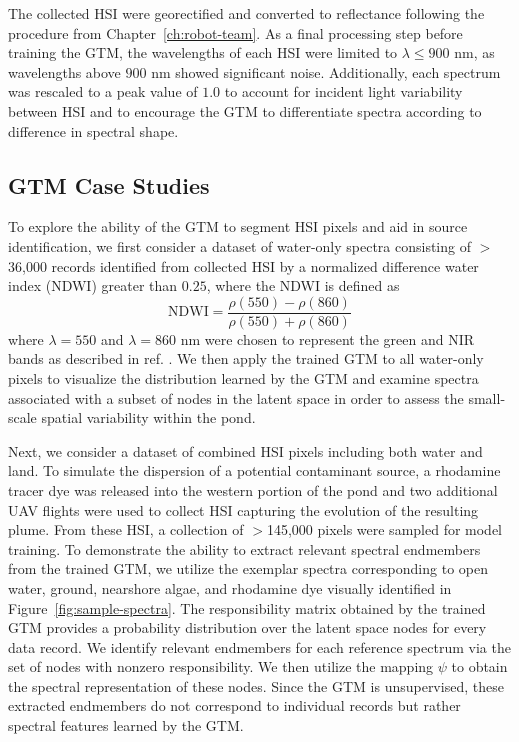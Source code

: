 The collected HSI were georectified and converted to reflectance following the
procedure from Chapter~\ref{ch:robot-team}. As a final processing step before
training the GTM, the wavelengths of each HSI were limited to $\lambda \leq 900$
nm, as wavelengths above $900$ nm showed significant noise. Additionally, each
spectrum was rescaled to a peak value of $1.0$ to account for incident light
variability between HSI and to encourage the GTM to differentiate spectra
according to difference in spectral shape.

\subsection{GTM Case Studies}\label{sec:case-studies}

To explore the ability of the GTM to segment HSI pixels and aid in source
identification, we first consider a dataset of water-only spectra consisting of
$>$36,000 records identified from collected HSI by a normalized difference water
index (NDWI) greater than $0.25$, where the NDWI is defined as
\begin{equation}
    \text{NDWI} = \dfrac{\rho(550) - \rho(860)}{\rho(550) + \rho(860)}
\end{equation}
where $\lambda=550$ and $\lambda=860$ nm were chosen to represent the green and
NIR bands as described in ref. \cite{ndwi}. We then apply the trained GTM to all
water-only pixels to visualize the distribution learned by the GTM and examine
spectra associated with a subset of nodes in the latent space in order to assess
the small-scale spatial variability within the pond.

Next, we consider a dataset of combined HSI pixels including both water and
land. To simulate the dispersion of a potential contaminant source, a rhodamine
tracer dye was released into the western portion of the pond and two additional
UAV flights were used to collect HSI capturing the evolution of the resulting
plume. From these HSI, a collection of $>$145,000 pixels were sampled for model
training. To demonstrate the ability to extract relevant spectral endmembers
from the trained GTM, we utilize the exemplar spectra corresponding to open
water, ground, nearshore algae, and rhodamine dye visually identified in
Figure~\ref{fig:sample-spectra}. The responsibility matrix obtained by the
trained GTM provides a probability distribution over the latent space nodes for
every data record. We identify relevant endmembers for each reference spectrum
via the set of nodes with nonzero responsibility. We then utilize the mapping
$\psi$ to obtain the spectral representation of these nodes. Since the GTM is
unsupervised, these extracted endmembers do not correspond to individual records
but rather spectral features learned by the GTM.

